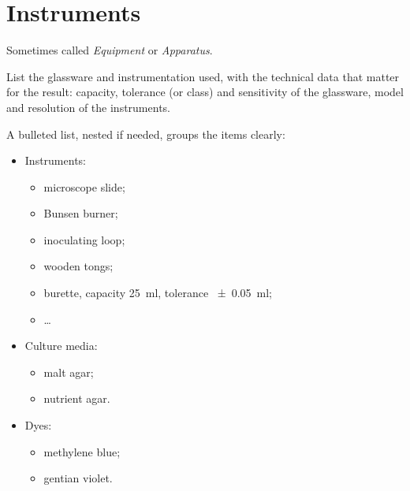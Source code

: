 \section{Instruments}
Sometimes called \emph{Equipment} or \emph{Apparatus}.

List the glassware and instrumentation used, with the technical data that matter for the result: capacity, tolerance (or class) and sensitivity of the glassware, model and resolution of the instruments.

A bulleted list, nested if needed, groups the items clearly:
\begin{itemize}
    \item Instruments:
          \begin{itemize}
              \item microscope slide;
              \item Bunsen burner;
              \item inoculating loop;
              \item wooden tongs;
              \item burette, capacity \qty{25}{\milli\litre}, tolerance \qty{\pm 0.05}{\milli\litre};
              \item \dots
          \end{itemize}
    \item Culture media:
          \begin{itemize}
              \item malt agar;
              \item nutrient agar.
          \end{itemize}
    \item Dyes:
          \begin{itemize}
              \item methylene blue;
              \item gentian violet.
          \end{itemize}
\end{itemize}

